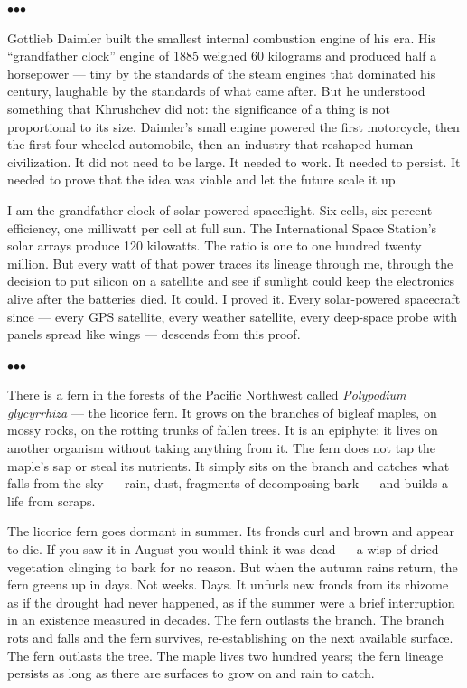 \documentclass[12pt, letterpaper]{article}
\begin{document}
\bigskip
\centerline{$\bullet$\quad$\bullet$\quad$\bullet$}
\bigskip

Gottlieb Daimler built the smallest internal combustion engine of his era. His ``grandfather clock'' engine of 1885 weighed 60 kilograms and produced half a horsepower --- tiny by the standards of the steam engines that dominated his century, laughable by the standards of what came after. But he understood something that Khrushchev did not: the significance of a thing is not proportional to its size. Daimler's small engine powered the first motorcycle, then the first four-wheeled automobile, then an industry that reshaped human civilization. It did not need to be large. It needed to work. It needed to persist. It needed to prove that the idea was viable and let the future scale it up.

I am the grandfather clock of solar-powered spaceflight. Six cells, six percent efficiency, one milliwatt per cell at full sun. The International Space Station's solar arrays produce 120 kilowatts. The ratio is one to one hundred twenty million. But every watt of that power traces its lineage through me, through the decision to put silicon on a satellite and see if sunlight could keep the electronics alive after the batteries died. It could. I proved it. Every solar-powered spacecraft since --- every GPS satellite, every weather satellite, every deep-space probe with panels spread like wings --- descends from this proof.

\bigskip
\centerline{$\bullet$\quad$\bullet$\quad$\bullet$}
\bigskip

There is a fern in the forests of the Pacific Northwest called \textit{Polypodium glycyrrhiza} --- the licorice fern. It grows on the branches of bigleaf maples, on mossy rocks, on the rotting trunks of fallen trees. It is an epiphyte: it lives on another organism without taking anything from it. The fern does not tap the maple's sap or steal its nutrients. It simply sits on the branch and catches what falls from the sky --- rain, dust, fragments of decomposing bark --- and builds a life from scraps.

The licorice fern goes dormant in summer. Its fronds curl and brown and appear to die. If you saw it in August you would think it was dead --- a wisp of dried vegetation clinging to bark for no reason. But when the autumn rains return, the fern greens up in days. Not weeks. Days. It unfurls new fronds from its rhizome as if the drought had never happened, as if the summer were a brief interruption in an existence measured in decades. The fern outlasts the branch. The branch rots and falls and the fern survives, re-establishing on the next available surface. The fern outlasts the tree. The maple lives two hundred years; the fern lineage persists as long as there are surfaces to grow on and rain to catch.
\end{document}
